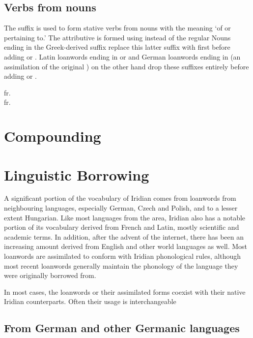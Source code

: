 \subsection{Verbs from nouns}

The suffix  is used to form stative verbs from nouns with the meaning `of or pertaining to.' The attributive is formed using  instead of the regular  Nouns ending in the Greek-derived suffix  replace this latter suffix with  first before adding  or . Latin loanwords ending in  or  and German loanwords ending in  (an assimilation of the original ) on the other hand drop these suffixes entirely before adding  or .

\ex
{} fr. \\
 fr. \\
\xe

\section{Compounding}\label{sec:compounding}

\section{Linguistic Borrowing}
A significant portion of the vocabulary of Iridian comes from loanwords from neighbouring languages, especially German, Czech and Polish, and to a lesser extent Hungarian. Like most languages from the area, Iridian also has a notable portion of its vocabulary derived from French and Latin, mostly scientific and academic terms. In addition, after the advent of the internet, there has been an increasing amount derived from English and other world languages as well. Most loanwords are assimilated to conform with Iridian phonological rules, although most recent loanwords generally maintain the phonology of the language they were originally borrowed from.

In most cases, the loanwords or their assimilated forms coexist with their native Iridian counterparts. Often their usage is interchangeable

\subsection{From German and other Germanic languages}

